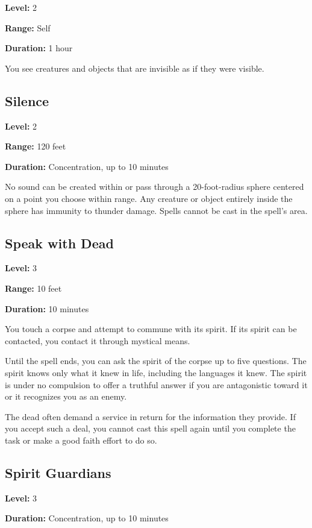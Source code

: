 \documentclass[12pt,letterpaper,twocolumn,openany,nodeprecatedcode,bg=none]{dndbook}
\let\oldsubsection\subsection
\renewcommand{\subsection}[1]{%
  \needspace{5\baselineskip}%
  \oldsubsection{#1}%
}
\begin{document}
\textbf{Level:} 2

\textbf{Range:} Self

\textbf{Duration:} 1 hour

You see creatures and objects that are invisible as if they were
visible.

\subsection{Silence}\label{silence}

\textbf{Level:} 2

\textbf{Range:} 120 feet

\textbf{Duration:} Concentration, up to 10 minutes

No sound can be created within or pass through a 20-foot-radius sphere
centered on a point you choose within range. Any creature or object
entirely inside the sphere has immunity to thunder damage. Spells cannot
be cast in the spell's area.

\subsection{Speak with Dead}\label{speak-with-dead}

\textbf{Level:} 3

\textbf{Range:} 10 feet

\textbf{Duration:} 10 minutes

You touch a corpse and attempt to commune with its spirit. If its spirit
can be contacted, you contact it through mystical means.

Until the spell ends, you can ask the spirit of the corpse up to five
questions. The spirit knows only what it knew in life, including the
languages it knew. The spirit is under no compulsion to offer a truthful
answer if you are antagonistic toward it or it recognizes you as an
enemy.

The dead often demand a service in return for the information they
provide. If you accept such a deal, you cannot cast this spell again
until you complete the task or make a good faith effort to do so.

\newpage

\subsection{Spirit Guardians}\label{spirit-guardians}

\textbf{Level:} 3

\textbf{Duration:} Concentration, up to 10 minutes
\end{document}
